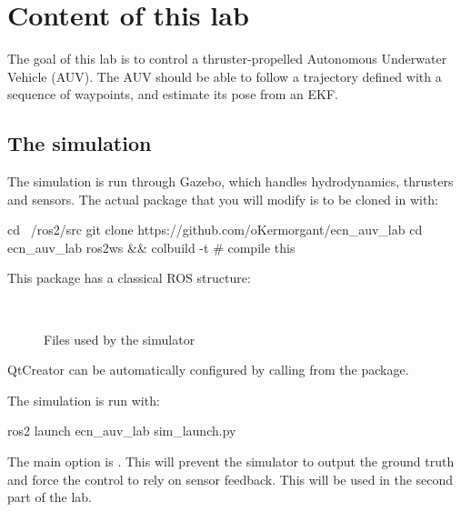\documentclass{ecnreport}
\begin{document}


\section{Content of this lab}

The goal of this lab is to control a thruster-propelled Autonomous Underwater Vehicle (AUV). The AUV should be able to follow a trajectory defined with a sequence of waypoints, and estimate its pose from an EKF.

\subsection{The simulation}

The simulation is run through Gazebo, which handles hydrodynamics, thrusters and sensors.
The actual package that you will modify is to be cloned in  with:
\begin{bashcodelarge}
cd ~/ros2/src
git clone https://github.com/oKermorgant/ecn_auv_lab
cd ecn_auv_lab
ros2ws && colbuild -t # compile this
\end{bashcodelarge}

This package has a classical ROS structure:
\begin{figure}[h]
\begin{minipage}{.25\linewidth} ~ \end{minipage}
\begin{minipage}{.5\linewidth}
\end{minipage}
\caption{Files used by the simulator}
\end{figure}

QtCreator can be automatically configured by calling  from the  package.

The simulation is run with:
\begin{bashcodelarge}
 ros2 launch ecn_auv_lab sim_launch.py
\end{bashcodelarge}

The main option is . This will prevent the simulator to output the ground truth and force the control to rely on sensor feedback. This will be used in the second part of the lab.
\end{document}
